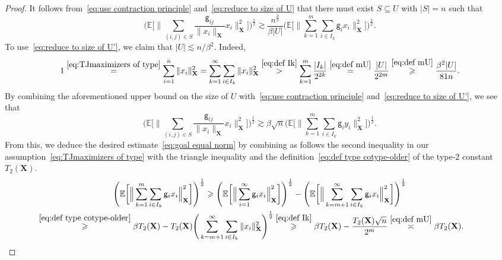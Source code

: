 \documentclass[11pt,reqno]{amsart}
\renewcommand{\ge}{\geqslant}
\newcommand{\X}{\mathbf X}
\theoremstyle{remark}
\renewcommand{\subset}{\subseteq}
\newcommand{\E}{\mathbb{ E}}
\renewcommand{\1}{\mathbf 1}
\newcommand{\g}{\mathsf{g}}
\begin{document}
\begin{proof}
It follows from~\eqref{eq:use contraction principle} and~\eqref{eq:reduce to size of U} that there must exist $S\subset U$ with $|S|=n$ such that
\begin{equation}\label{eq:reduce to size of U'}
\Bigg(\E\bigg[\Big\|\sum_{(i,j)\in S} \frac{\g_{ij}}{\|x_i\|_\X}x_i\Big\|_\X^2\bigg]\Bigg)^{\frac12}\gtrsim \frac{n^{\frac32}}{\beta|U|}\Bigg(\E\bigg[\Big\|\sum_{k=1}^m\sum_{i\in I_k}\g_{i}  x_i\Big\|_\X^2\bigg]\Bigg)^{\frac12}.
\end{equation}
To use~\eqref{eq:reduce to size of U'}, we claim that  $|U|\lesssim n/\beta^2$. Indeed,
$$
1\stackrel{\eqref{eq:TJmaximizers of type}}{=}\sum_{i=1}^n \|x_i\|_\X^2=\sum_{k=1}^\infty\sum_{i\in I_k} \|x_i\|_\X^2 \stackrel{\eqref{eq:def Ik}}{>}   \sum_{k=1}^m \frac{|I_k|}{2^{2k}}\stackrel{\eqref{eq:def mU}}{=}\frac{|U|}{2^{2m}}\stackrel{\eqref{eq:def mU}}{\ge} \frac{\beta^2|U|}{81n}.
$$
By combining the aforementioned upper bound on the size of $U$ with~\eqref{eq:use contraction principle} and~\eqref{eq:reduce to size of U'}, we see that
$$
\Bigg(\E\bigg[\Big\|\sum_{(i,j)\in S} \frac{\g_{ij}}{\|x_i\|_\X}x_i\Big\|_\X^2\bigg]\Bigg)^{\frac12}\gtrsim \beta\sqrt{n}\Bigg(\E\bigg[\Big\|\sum_{k=1}^m\sum_{i\in I_k}\g_{i}  y_i\Big\|_\X^2\bigg]\Bigg)^{\frac12}.
$$
From this, we deduce the desired estimate~\eqref{eq:goal equal norm} by combining as follows the second inequality in our assumption~\eqref{eq:TJmaximizers of type} with the triangle inequality and the definition~\eqref{eq:def type cotype-older} of the type-$2$ constant $T_2(\X)$.
\begin{multline*}
\Bigg(\E\bigg[\Big\|\sum_{k=1}^m\sum_{i\in I_k}\g_{i}  x_i\Big\|_\X^2\bigg]\Bigg)^{\frac12}\ge \Bigg(\E\bigg[\Big\|\sum_{i=1}^\infty\g_{i}  x_i\Big\|_\X^2\bigg]\Bigg)^{\frac12}-\Bigg(\E\bigg[\Big\|\sum_{k=m+1}^\infty\sum_{i\in I_k}\g_{i}  x_i\Big\|_\X^2\bigg]\Bigg)^{\frac12}\\\stackrel{\eqref{eq:def type cotype-older}}{\ge}
\beta T_2(\X)-T_2(\X)\Bigg(\sum_{k=m+1}^\infty\sum_{i\in I_k}\|x_i\|_\X^2\Bigg)^{\frac12}
\stackrel{\eqref{eq:def Ik}}{\ge} \beta T_2(\X)-\frac{T_2(\X)\sqrt{n}}{2^m}\stackrel{\eqref{eq:def mU}}{\asymp} \beta T_2(\X). \tag*{\qedhere}
\end{multline*}
\end{proof}
\end{document}

